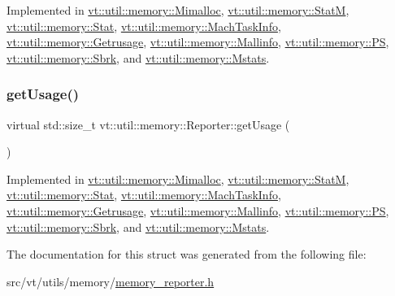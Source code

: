 Implemented in \hyperlink{structvt_1_1util_1_1memory_1_1_mimalloc_a94ad64b69062aeae79fa2d2067cf27f1}{vt\+::util\+::memory\+::\+Mimalloc}, \hyperlink{structvt_1_1util_1_1memory_1_1_stat_m_ad8ea55e89ec3c591348a26b670048814}{vt\+::util\+::memory\+::\+StatM}, \hyperlink{structvt_1_1util_1_1memory_1_1_stat_a2a29912688c89bcb98d6132ecda6070f}{vt\+::util\+::memory\+::\+Stat}, \hyperlink{structvt_1_1util_1_1memory_1_1_mach_task_info_a4800048748574a7d57799c442aa2c390}{vt\+::util\+::memory\+::\+Mach\+Task\+Info}, \hyperlink{structvt_1_1util_1_1memory_1_1_getrusage_ae1261aca38feffabbbc8b8a510556d8b}{vt\+::util\+::memory\+::\+Getrusage}, \hyperlink{structvt_1_1util_1_1memory_1_1_mallinfo_a0e916973e080d93677e2e4f4cbf63580}{vt\+::util\+::memory\+::\+Mallinfo}, \hyperlink{structvt_1_1util_1_1memory_1_1_p_s_a011bb0261eefffa53110ba35243c4c8b}{vt\+::util\+::memory\+::\+PS}, \hyperlink{structvt_1_1util_1_1memory_1_1_sbrk_a21fc8bafbdf0a4bb92184474dae1d0f1}{vt\+::util\+::memory\+::\+Sbrk}, and \hyperlink{structvt_1_1util_1_1memory_1_1_mstats_a4718704523896839b8c7955d1098b647}{vt\+::util\+::memory\+::\+Mstats}.

\mbox{\label{structvt_1_1util_1_1memory_1_1_reporter_a372574f51fdb68077cd3d227ee373de5}} 
\subsubsection{\texorpdfstring{get\+Usage()}{getUsage()}}
{\footnotesize\ttfamily virtual std\+::size\+\_\+t vt\+::util\+::memory\+::\+Reporter\+::get\+Usage (\begin{DoxyParamCaption}{ }\end{DoxyParamCaption})\hspace{0.3cm}{\ttfamily [pure virtual]}}



Implemented in \hyperlink{structvt_1_1util_1_1memory_1_1_mimalloc_ab404700265f120eedb4cf06e4ae0b602}{vt\+::util\+::memory\+::\+Mimalloc}, \hyperlink{structvt_1_1util_1_1memory_1_1_stat_m_a066c740a52e05e7184dfff530ed07173}{vt\+::util\+::memory\+::\+StatM}, \hyperlink{structvt_1_1util_1_1memory_1_1_stat_aa14297e6605a523e4164597d45fba06f}{vt\+::util\+::memory\+::\+Stat}, \hyperlink{structvt_1_1util_1_1memory_1_1_mach_task_info_a8d610d4ca50ad62ef2dc623713a67b7d}{vt\+::util\+::memory\+::\+Mach\+Task\+Info}, \hyperlink{structvt_1_1util_1_1memory_1_1_getrusage_a976a842feb631dfb19c2f4ecda2398ab}{vt\+::util\+::memory\+::\+Getrusage}, \hyperlink{structvt_1_1util_1_1memory_1_1_mallinfo_a872e568b6266e301844dbc252886794f}{vt\+::util\+::memory\+::\+Mallinfo}, \hyperlink{structvt_1_1util_1_1memory_1_1_p_s_a8637d08841cd23f361e83be9cc15e2b4}{vt\+::util\+::memory\+::\+PS}, \hyperlink{structvt_1_1util_1_1memory_1_1_sbrk_af4df47e41f60e7f2da7a6b47c8b4a046}{vt\+::util\+::memory\+::\+Sbrk}, and \hyperlink{structvt_1_1util_1_1memory_1_1_mstats_aa3ba12317492d6f3c95f6b2bbb20f831}{vt\+::util\+::memory\+::\+Mstats}.



The documentation for this struct was generated from the following file\+:\begin{DoxyCompactItemize}
\item 
src/vt/utils/memory/\hyperlink{memory__reporter_8h}{memory\+\_\+reporter.\+h}\end{DoxyCompactItemize}
